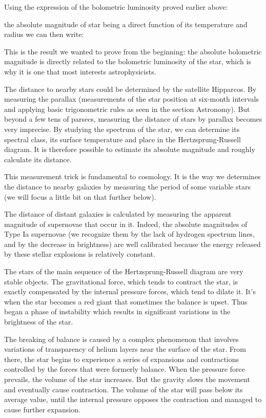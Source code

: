 	Using the expression of the bolometric luminosity proved earlier above:
	
	the absolute magnitude of star being a direct function of its temperature and radius we can then write:
	
	This is the result we wanted to prove from the beginning: the absolute bolometric magnitude is directly related to the bolometric luminosity of the star, which is why it is one that most interests astrophysicists.
	\begin{tcolorbox}[title=Remark,colframe=black,arc=10pt]
	The distance to nearby stars could be determined by the satellite Hipparcos. By measuring the parallax (measurements of the star position at six-month intervals and applying basic trigonometric rules as seen in the section Astronomy). But beyond a few tens of parsecs, measuring the distance of stars by parallax becomes very imprecise. By studying the spectrum of the star, we can determine its spectral class, its surface temperature and place in the Hertzsprung-Russell diagram. It is therefore possible to estimate its absolute magnitude and roughly calculate its distance.
	\end{tcolorbox}
	This measurement trick is fundamental to cosmology. It is the way we determines the distance to nearby galaxies by measuring the period of some variable stars (we will focus a little bit on that further below).

	The distance of distant galaxies is calculated by measuring the apparent magnitude of supernovae that occur in it. Indeed, the absolute magnitudes of Type Ia supernovae (we recognize them by the lack of hydrogen spectrum lines, and by the decrease in brightness) are well calibrated because the energy released by these stellar explosions is relatively constant.
	
	The stars of the main sequence of the Hertzsprung-Russell diagram are very stable objects. The gravitational force, which tends to contract the star, is exactly compensated by the internal pressure forces, which tend to dilate it. It's when the star becomes a red giant that sometimes the balance is upset. Thus began a phase of instability which results in significant variations in the brightness of the star.

	The breaking of balance is caused by a complex phenomenon that involves variations of transparency of helium layers near the surface of the star. From there, the star begins to experience a series of expansions and contractions controlled by the forces that were formerly balance. When the pressure force prevails, the volume of the star increases. But the gravity slows the movement and eventually cause contraction. The volume of the star will pass below its average value, until the internal pressure opposes the contraction and managed to cause further expansion.

